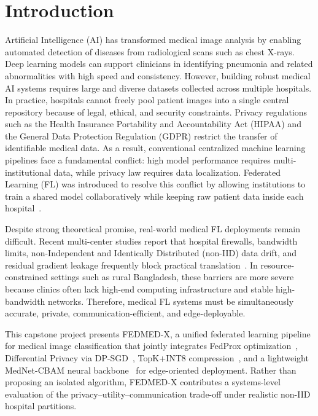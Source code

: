 \chapter{Introduction}

Artificial Intelligence (AI) has transformed medical image analysis by enabling
automated detection of diseases from radiological scans such as chest X-rays.
Deep learning models can support clinicians in identifying pneumonia and
related abnormalities with high speed and consistency. However, building robust
medical AI systems requires large and diverse datasets collected across
multiple hospitals. In practice, hospitals cannot freely pool patient images
into a single central repository because of legal, ethical, and security
constraints. Privacy regulations such as the Health Insurance Portability and
Accountability Act (HIPAA) and the General Data Protection Regulation (GDPR)
restrict the transfer of identifiable medical data. As a result, conventional
centralized machine learning pipelines face a fundamental conflict: high model
performance requires multi-institutional data, while privacy law requires data
localization. Federated Learning (FL) was introduced to resolve this conflict
by allowing institutions to train a shared model collaboratively while keeping
raw patient data inside each hospital~\cite{mcmahan2017communication,
guan2024federated,li2020fedprox}.

Despite strong theoretical promise, real-world medical FL deployments remain
difficult. Recent multi-center studies report that hospital firewalls,
bandwidth limits, non-Independent and Identically Distributed (non-IID) data
drift, and residual gradient leakage frequently block practical
translation~\cite{bujotzek2024real,schoenpflug2025navigating,
koutsoubis2024future,hindawi2025federated}. In resource-constrained settings
such as rural Bangladesh, these barriers are more severe because clinics often
lack high-end computing infrastructure and stable high-bandwidth networks.
Therefore, medical FL systems must be simultaneously accurate, private,
communication-efficient, and edge-deployable.

This capstone project presents FEDMED-X, a unified federated learning pipeline
for medical image classification that jointly integrates FedProx
optimization~\cite{li2020fedprox,yuan2022convergence}, Differential Privacy
via DP-SGD~\cite{abadi2016deep,mironov2017renyi,ziller2021differentially},
TopK+INT8 compression~\cite{habib2025cflsparsemed,zhou2022communication}, and
a lightweight MedNet-CBAM neural
backbone~\cite{woo2018cbam,yang2023medmnist} for edge-oriented deployment.
Rather than proposing an isolated algorithm, FEDMED-X contributes a
systems-level evaluation of the privacy--utility--communication trade-off
under realistic non-IID hospital partitions.

